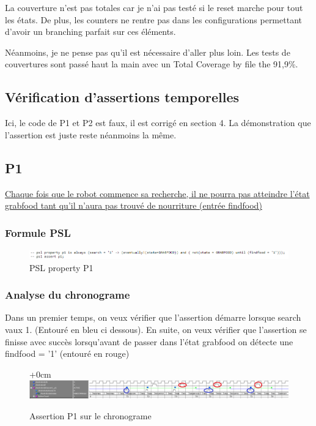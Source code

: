 \documentclass{article}
\newcommand{\sautligne}{
\textbf{\vspace{5mm}}
}
\begin{document}
La couverture n'est pas totales car je n'ai pas testé si le reset marche pour tout les états. De plus, les counters ne rentre pas dans les configurations permettant d'avoir un branching parfait sur ces éléments. 
\sautligne 

Néanmoins, je ne pense pas qu'il est nécessaire d'aller plus loin. Les tests de couvertures sont passé haut la main avec un Total Coverage by file the 91,9\%.

\newpage


\begin{landscape}
\section{Vérification d'assertions temporelles}

Ici, le code de P1 et P2 est faux, il est corrigé en section 4. La démonstration que l'assertion est juste reste néanmoins la même.

\subsection{P1}
\uline{Chaque fois que le robot commence sa recherche, il ne pourra pas atteindre l'état 
grabfood tant qu'il n'aura pas trouvé de nourriture (entrée findfood)}

\subsubsection{Formule PSL }
\begin{figure}[!h]
\centering
\includegraphics[scale=0.8]{PSL/P1.PNG}
\caption{PSL property P1}
\end{figure}

\subsubsection{Analyse du chronograme}
Dans un premier temps, on veux vérifier que l'assertion démarre lorsque search vaux 1. (Entouré en bleu ci dessous). 
En suite, on veux vérifier que l'assertion se finisse avec succès lorsqu'avant de passer dans l'état grabfood on détecte une findfood = '1' (entouré en rouge)

\begin{figure}[!h]
\advance\leftskip+0cm
\includegraphics[scale=0.45]{PSL/P1-1.PNG}
\caption{Assertion P1 sur le chronograme }
\end{figure}


\end{landscape}
\end{document}
